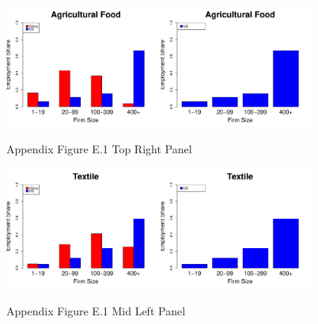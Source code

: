 \documentclass[twoside,12pt,leqno]{article}
\begin{document}
\begin{figure}[h]
    \begin{center}
    \includegraphics[width=0.45\textwidth]{./Figures/FigureE1_TopRight.pdf}
    \includegraphics[width=0.45\textwidth]{./Figures/FigureE1_US_TopRight.pdf}
    \caption{Appendix Figure E.1 Top Right Panel}
    \end{center}
\end{figure}

\begin{figure}[h]
    \begin{center}
    \includegraphics[width=0.45\textwidth]{./Figures/FigureE1_MidLeft.pdf}
    \includegraphics[width=0.45\textwidth]{./Figures/FigureE1_US_MidLeft.pdf}
    \caption{Appendix Figure E.1 Mid Left Panel}
    \end{center}
\end{figure}
\end{document}
